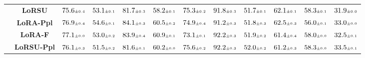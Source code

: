 \begin{table}
\begin{center}
\begin{small}
\begin{tabular}{l c c c c c c c c c c c}
& \textbf{LoRSU} & $75.6 \mtiny{\pm 0.4}$ & $53.1 \mtiny{\pm 0.1}$ & $81.7 \mtiny{\pm 0.3}$ & $58.2 \mtiny{\pm 0.1}$ & $75.3 \mtiny{\pm 0.2}$ & $91.8 \mtiny{\pm 0.3}$ & $51.7 \mtiny{\pm 0.1}$ & $62.1 \mtiny{\pm 0.1}$ & $58.3 \mtiny{\pm 0.1}$ & $31.9 \mtiny{\pm 0.0}$ \\
& \textbf{LoRA-Ppl} & $76.9 \mtiny{\pm 0.4}$ & $54.6 \mtiny{\pm 0.1}$ & $84.1 \mtiny{\pm 0.3}$ & $60.5 \mtiny{\pm 0.2}$ & $74.9 \mtiny{\pm 0.4}$ & $91.2 \mtiny{\pm 0.3}$ & $51.8 \mtiny{\pm 0.3}$ & $62.5 \mtiny{\pm 0.3}$ & $56.0 \mtiny{\pm 0.1}$ & $33.0 \mtiny{\pm 0.0}$ \\
& \textbf{LoRA-F} & $77.1 \mtiny{\pm 0.0}$ & $53.0 \mtiny{\pm 0.2}$ & $83.9 \mtiny{\pm 0.4}$ & $60.9 \mtiny{\pm 0.1}$ & $73.1 \mtiny{\pm 0.1}$ & $92.2 \mtiny{\pm 0.3}$ & $51.9 \mtiny{\pm 0.2}$ & $61.4 \mtiny{\pm 0.4}$ & $58.0 \mtiny{\pm 0.0}$ & $32.5 \mtiny{\pm 0.1}$ \\
& \textbf{LoRSU-Ppl} & $76.1 \mtiny{\pm 0.3}$ & $51.5 \mtiny{\pm 0.2}$ & $81.6 \mtiny{\pm 0.1}$ & $60.2 \mtiny{\pm 0.0}$ & $75.6 \mtiny{\pm 0.2}$ & $92.2 \mtiny{\pm 0.3}$ & $52.0 \mtiny{\pm 0.2}$ & $61.2 \mtiny{\pm 0.3}$ & $58.3 \mtiny{\pm 0.0}$ & $33.5 \mtiny{\pm 0.1}$ \\
\bottomrule
\end{tabular}
\endgroup
\end{small}
\end{center}
\vskip -0.1in
\end{table}
